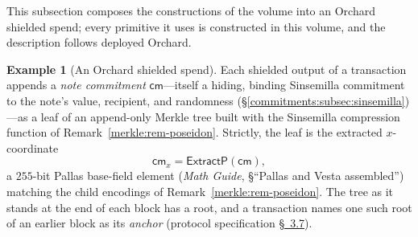 \documentclass[11pt,a4paper]{article}
\theoremstyle{definition}
\newtheorem{example}[theorem]{Example}
\theoremstyle{remark}
\begin{document}
This subsection composes the constructions of the volume into an
Orchard shielded spend; every primitive it uses is constructed in this
volume, and the description follows deployed Orchard.

\begin{example}[An Orchard shielded spend]\label{merkle:exp-orchard}
Each shielded output of a transaction appends a \emph{note
commitment} \(\mathsf{cm}\)---itself a hiding, binding Sinsemilla
commitment to the note's value, recipient, and randomness
(\S\ref{commitments:subsec:sinsemilla})---as a leaf of an append-only
Merkle tree built with the Sinsemilla compression function of
Remark~\ref{merkle:rem-poseidon}. Strictly, the leaf is the extracted
\(x\)-coordinate
\[
\mathsf{cm}_x = \mathsf{ExtractP}(\mathsf{cm}),
\]
a \(255\)-bit Pallas base-field element (\emph{Math Guide},
\S``Pallas and Vesta assembled'') matching the child encodings of
Remark~\ref{merkle:rem-poseidon}. The tree as it stands at the end of
each block has a root, and a transaction names one such root of an
earlier block as its \emph{anchor} (protocol specification
\href{https://zips.z.cash/protocol/protocol.pdf\#actions}{\S~3.7}).


\end{example}
\end{document}
